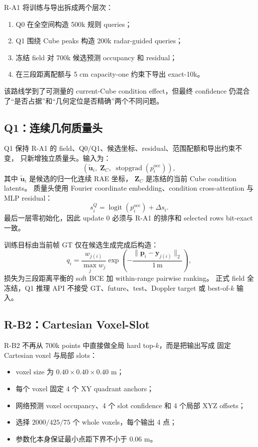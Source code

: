 \documentclass[11pt,a4paper,fontset=none]{ctexart}
\begin{document}
R-A1 将训练与导出拆成两个层次：
\begin{enumerate}
  \item Q0 在全空间构造 500k 规则 queries；
  \item Q1 围绕 Cube peaks 构造 200k radar-guided queries；
  \item 冻结 field 对 700k 候选预测 occupancy 和 residual；
  \item 在三段距离配额与 5 cm capacity-one 约束下导出 exact-10k。
\end{enumerate}
该路线学到了可测量的 current-Cube condition effect，但最终 confidence
仍混合了“是否占据”和“几何定位是否精确”两个不同问题。

\subsection{Q1：连续几何质量头}

Q1 保持 R-A1 的 field、Q0/Q1、候选坐标、residual、范围配额和导出约束不变，
只新增独立质量头。输入为：
\begin{equation}
  \left(\widetilde{\mathbf u}_i,\;\mathbf Z_C,\;
  \operatorname{stopgrad}(p_i^{\mathrm{occ}})\right),
\end{equation}
其中 $\widetilde{\mathbf u}_i$ 是候选的归一化连续 RAE 坐标，
$\mathbf Z_C$ 是冻结的当前 Cube condition latents。
质量头使用 Fourier coordinate embedding、condition cross-attention
与 MLP residual：
\begin{equation}
  s_i^{Q}
  =\operatorname{logit}(p_i^{\mathrm{occ}})+\Delta s_i.
\end{equation}
最后一层零初始化，因此 update 0 必须与 R-A1 的排序和 selected rows
bit-exact 一致。

训练目标由当前帧 GT 仅在候选生成完成后构造：
\begin{equation}
  q_i=
  \frac{w_{j(i)}}{\max_j w_j}
  \exp\left(-\frac{\lVert\mathbf p_i-\mathbf y_{j(i)}\rVert_2}{1\,\mathrm m}\right),
\end{equation}
损失为三段距离平衡的 soft BCE 加 within-range pairwise ranking。
正式 field 全冻结，Q1 推理 API 不接受 GT、future、test、Doppler target
或 best-of-$k$ 输入。

\subsection{R-B2：Cartesian Voxel-Slot}

R-B2 不再从 700k points 中直接做全局 hard top-$k$，而是把输出写成
固定 Cartesian voxel 与局部 slots：
\begin{itemize}
  \item voxel size 为 $0.40\times0.40\times0.40$ m；
  \item 每个 voxel 固定 4 个 XY quadrant anchors；
  \item 网络预测 voxel occupancy、4 个 slot confidence 和 4 个局部 XYZ offsets；
  \item 选择 $2000/425/75$ 个 whole voxels，每个输出 4 点；
  \item 参数化本身保证最小点距下界不小于 0.06 m。
\end{itemize}
\end{document}
